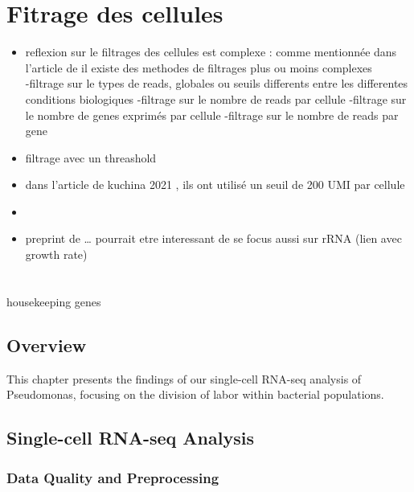 \documentclass[
  11pt,
  a4paper,
]{report}
\begin{document}

\chapter{Fitrage des cellules}\label{fitrage-des-cellules}

\begin{itemize}
\item
  reflexion sur le filtrages des cellules est complexe : comme
  mentionnée dans l'article de il existe des methodes de filtrages plus
  ou moins complexes\\
  -filtrage sur le types de reads, globales ou seuils differents entre
  les differentes conditions biologiques -filtrage sur le nombre de
  reads par cellule -filtrage sur le nombre de genes exprimés par
  cellule -filtrage sur le nombre de reads par gene
\item
  filtrage avec un threashold
\item
  dans l'article de kuchina 2021 , ils ont utilisé un seuil de 200 UMI
  par cellule
\item
\item
  preprint de \ldots{} pourrait etre interessant de se focus aussi sur
  rRNA (lien avec growth rate)
\end{itemize}


\chapter{}\label{section}

housekeeping genes

\section{Overview}\label{overview}

This chapter presents the findings of our single-cell RNA-seq analysis
of Pseudomonas, focusing on the division of labor within bacterial
populations.

\section{Single-cell RNA-seq
Analysis}\label{single-cell-rna-seq-analysis}

\subsection{Data Quality and
Preprocessing}\label{data-quality-and-preprocessing}
\end{document}
